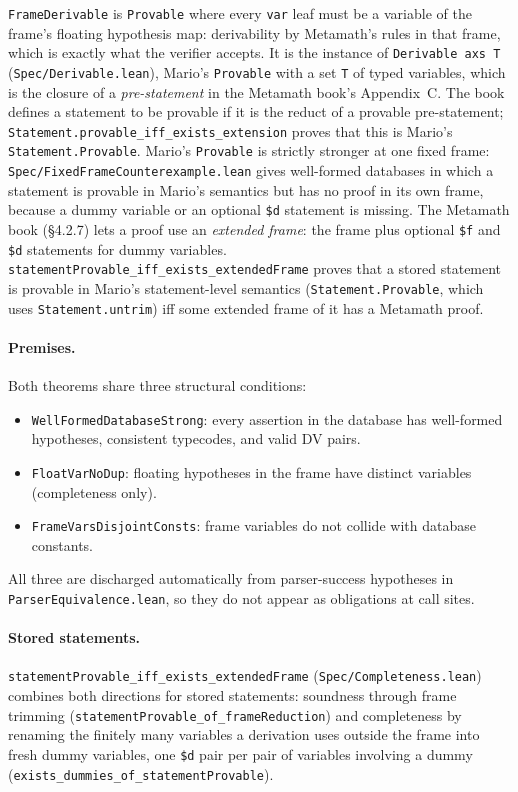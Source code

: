 \documentclass[11pt]{article}
\newcommand{\lean}[1]{\lstinline[language=Lean4]{#1}}
\newcommand{\file}[1]{\texttt{#1}}
\begin{document}
\lean{FrameDerivable} is \lean{Provable} where every \lean{var} leaf
must be a variable of the frame's floating hypothesis map: derivability
by Metamath's rules in that frame, which is exactly what the verifier
accepts.  It is the instance of \lean{Derivable axs T} (\file{Spec/Derivable.lean}),
Mario's \lean{Provable} with a set \lean{T} of typed variables, which
is the closure of a \emph{pre-statement} in the Metamath book's
Appendix~C.  The book defines a statement to be provable if it is the
reduct of a provable pre-statement;
\lean{Statement.provable_iff_exists_extension} proves that this is
Mario's \lean{Statement.Provable}.  Mario's \lean{Provable} is strictly stronger at one fixed
frame: \file{Spec/FixedFrameCounterexample.lean} gives well-formed
databases in which a statement is provable in Mario's semantics but has
no proof in its own frame, because a dummy variable or an optional
\verb|$d| statement is missing.  The Metamath book (\S4.2.7) lets a proof
use an \emph{extended frame}: the frame plus optional \verb|$f| and
\verb|$d| statements for dummy variables.
\lean{statementProvable_iff_exists_extendedFrame} proves that a stored
statement is provable in Mario's statement-level semantics
(\lean{Statement.Provable}, which uses \lean{Statement.untrim}) iff
some extended frame of it has a Metamath proof.

\paragraph{Premises.}
Both theorems share three structural conditions:
\begin{itemize}[leftmargin=2em]
\item \lean{WellFormedDatabaseStrong}: every assertion in the database
  has well-formed hypotheses, consistent typecodes, and valid DV pairs.
\item \lean{FloatVarNoDup}: floating hypotheses in the frame have
  distinct variables (completeness only).
\item \lean{FrameVarsDisjointConsts}: frame variables do not collide
  with database constants.
\end{itemize}
All three are discharged automatically from parser-success hypotheses
in \file{ParserEquivalence.lean}, so they do not appear as obligations
at call sites.

\paragraph{Stored statements.}
\lean{statementProvable_iff_exists_extendedFrame}
(\file{Spec/Completeness.lean}) combines both directions for stored
statements: soundness through frame trimming
(\lean{statementProvable_of_frameReduction}) and completeness by renaming
the finitely many variables a derivation uses outside the frame into
fresh dummy variables, one \verb|$d| pair per pair of variables involving
a dummy (\lean{exists_dummies_of_statementProvable}).
\end{document}
